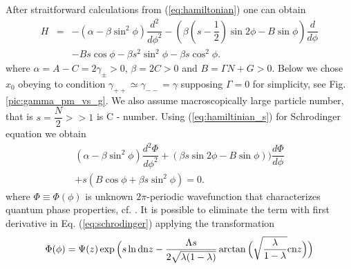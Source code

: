 \documentclass[aps, pre, preprint, groupedaddress, superscriptaddress, showkeys, showpacs] {revtex4-1}
\DeclarePairedDelimiter\ket{\lvert}{\rangle}
\begin{document}
After straitforward calculations from (\ref{eq:hamiltonian}) one can obtain
%
\begin{equation}
\begin{array}{lcl}
H & = & -(\alpha - \beta \sin^2 \phi) \dfrac{d^2}{d \phi^2} - (\beta(s-\dfrac{1}{2})\sin{2\phi} - B\sin{\phi}) \dfrac{d}{d \phi} \\
&& - Bs \cos \phi - \beta s^2 \sin^2 \phi - \beta s \cos^2 \phi.
\end{array}
\label{eq:hamiltinian_s}
\end{equation}
%
where $\alpha = A - C = 2\gamma_{\pm} > 0$, $\beta = 2C > 0$ and $B = \Gamma N + G > 0$.
Below we chose $x_0$ obeying to condition $\gamma_{++} \simeq \gamma_{--} = \gamma$ supposing $\Gamma = 0$ for simplicity, see Fig. \ref{pic:gamma_pm_vs_g}. We also assume macroscopically large particle number, that is $s = \dfrac{N}{2} >> 1$ is C - number. Using (\ref{eq:hamiltinian_s})  for Schrodinger equation we obtain   
%
\begin{equation}
\begin{array}{l}
(\alpha - \beta \sin^2 \phi) \dfrac{d^2 \Phi}{d \phi^2} + (\beta s\sin{2\phi}-B\sin{\phi})) \dfrac{d \Phi}{d \phi} \\
+ s(B \cos \phi + \beta s \sin^2 \phi) = 0.
\end{array}
\label{eq:schrodinger}
\end{equation}
%
where $\Phi \equiv \Phi(\phi)$ is unknown $2\pi$-periodic wavefunction that characterizes quantum phase properties, cf. \cite{Anglin}.
%
%
%
%
It is possible to eliminate the term with first derivative in Eq. (\ref{eq:schrodinger}) applying the transformation
%
\begin{equation}
\Phi(\phi) = \Psi(z) \exp \Big( s \ln \textrm{dn}{z} - \dfrac{\Lambda s}{2 \sqrt{\lambda (1 - \lambda)}} \arctan \Big( \sqrt{\dfrac{\lambda}{1 - \lambda}} \textrm{cn}{z} \Big) \Big)
\label{eq:transformation_of_phi}
\end{equation}
\end{document}
